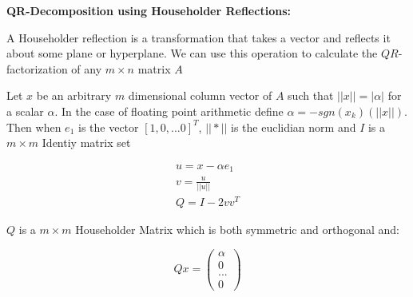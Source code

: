 \documentclass{report}
\begin{document}

\textbf{QR-Decomposition using Householder Reflections:}

A Householder reflection is a transformation that takes a vector and reflects it about some plane or hyperplane. We can use this operation to calculate the $QR$-factorization of any $m \times n$ matrix $A$ 

Let $x$ be an arbitrary $m$ dimensional column vector of $A$ such that $||x|| = | \alpha |$ for a scalar $\alpha$. In the case of floating point arithmetic define $\alpha = -sgn(x_k)(||x||)$.
Then when $e_1$ is the vector $[1,0,...0]^T$, $||*||$ is the euclidian norm and $I$ is a $m \times m$ Identiy matrix set

\begin{align}
    u = x - \alpha e_1 \\
    v = \frac{u}{||u||} \\
    Q = I-2vv^T
\end{align}

$Q$ is a $m \times m$ Householder Matrix which is both symmetric and orthogonal and:

 \begin{equation}
     Qx = \begin{pmatrix} \alpha \\ 0 \\ ... \\ 0 \end{pmatrix}
\end{equation}
\end{document}
